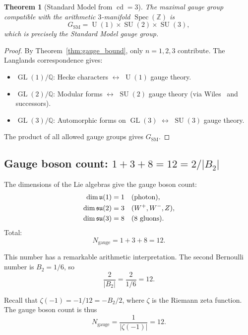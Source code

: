\documentclass[12pt,a4paper]{article}
\newtheorem{theorem}{Theorem}[section]
\theoremstyle{definition}
\newcommand{\Spec}{\operatorname{Spec}}
\newcommand{\GL}{\operatorname{GL}}
\newcommand{\SU}{\operatorname{SU}}
\newcommand{\cd}{\operatorname{cd}}
\newcommand{\Q}{\mathbb{Q}}
\newcommand{\Z}{\mathbb{Z}}
\newcommand{\U}{\operatorname{U}}
\begin{document}
\begin{theorem}[Standard Model from $\cd = 3$]\label{thm:SM}
The maximal gauge group compatible with the arithmetic
$3$-manifold $\Spec(\Z)$ is
\[
  G_{\mathrm{SM}} = \U(1) \times \SU(2) \times \SU(3),
\]
which is precisely the Standard Model gauge group.
\end{theorem}

\begin{proof}
By Theorem~\ref{thm:gauge_bound}, only $n=1,2,3$ contribute.
The Langlands correspondence gives:
\begin{itemize}
  \item $\GL(1)/\Q$: Hecke characters $\leftrightarrow$ $\U(1)$ gauge theory.
  \item $\GL(2)/\Q$: Modular forms $\leftrightarrow$ $\SU(2)$ gauge theory
    (via Wiles~\cite{Wiles} and successors).
  \item $\GL(3)/\Q$: Automorphic forms on $\GL(3)$
    $\leftrightarrow$ $\SU(3)$ gauge theory.
\end{itemize}
The product of all allowed gauge groups gives $G_{\mathrm{SM}}$.
\end{proof}

\subsection{Gauge boson count: $1+3+8 = 12 = 2/|B_2|$}

The dimensions of the Lie algebras give the gauge boson count:
\begin{align}
  \dim \mathfrak{u}(1) &= 1 & &(\text{photon}), \notag\\
  \dim \mathfrak{su}(2) &= 3 & &(W^+, W^-, Z), \notag\\
  \dim \mathfrak{su}(3) &= 8 & &(\text{8 gluons}). \notag
\end{align}
Total:
\begin{equation}\label{eq:12bosons}
  N_{\text{gauge}} = 1 + 3 + 8 = 12.
\end{equation}

This number has a remarkable arithmetic interpretation.
The second Bernoulli number is $B_2 = 1/6$, so
\begin{equation}
  \frac{2}{|B_2|} = \frac{2}{1/6} = 12.
\end{equation}

Recall that $\zeta(-1) = -1/12 = -B_2/2$, where $\zeta$ is the
Riemann zeta function.  The gauge boson count is thus
\begin{equation}
  N_{\text{gauge}} = \frac{1}{|\zeta(-1)|} = 12.
\end{equation}
\end{document}

